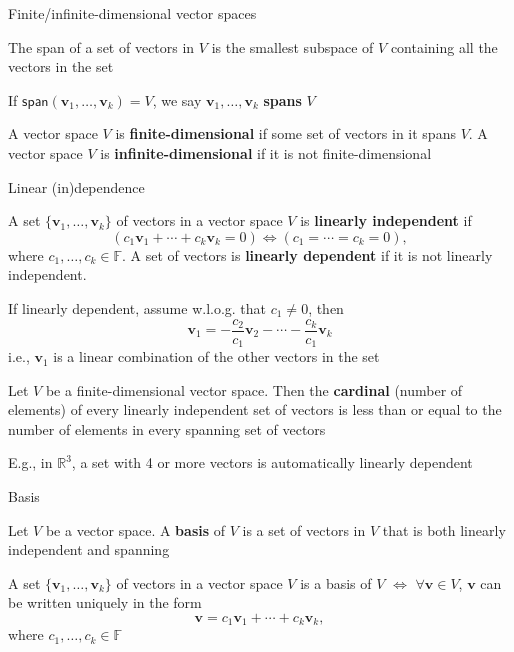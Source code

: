 \documentclass{beamer}
\def\IF{\mathbb{F}}
\def\IR{\mathbb{R}}
\def\bv{\mathbf{v}}
\renewcommand{\span}{\ensuremath{\mathsf{span}}}
\begin{document}
\begin{frame}{Finite/infinite-dimensional vector spaces}
	\begin{theorem}
		The span of a set of vectors in $V$ is the smallest subspace of $V$ containing all the vectors in the set
	\end{theorem}
	\vfill
	\begin{definition}
		If $\span(\bv_1,\ldots,\bv_k)=V$, we say $\bv_1,\ldots,\bv_k$ \textbf{spans} $V$
	\end{definition}
	\vfill
	\begin{definition}
		A vector space $V$ is \textbf{finite-dimensional} if some set of vectors in it spans $V$.
		A vector space $V$ is \textbf{infinite-dimensional} if it is not finite-dimensional
	\end{definition}
\end{frame}


\begin{frame}{Linear (in)dependence}
	\begin{definition}
		A set $\{\bv_1,\ldots,\bv_k\}$ of vectors in a vector space $V$ is \textbf{linearly independent} if
		\[
		\left(c_1\bv_1+\cdots+c_k\bv_k=0\right)
		\Leftrightarrow
		\left(c_1=\cdots=c_k=0\right),
		\]
		where $c_1,\ldots,c_k\in\IF$. 
		A set of vectors is \textbf{linearly dependent} if it is not linearly independent.
	\end{definition}
	\vfill
	If linearly dependent, assume w.l.o.g. that $c_1\neq 0$, then
	\[
	\bv_1 = -\frac{c_2}{c_1}\bv_2-\cdots-\frac{c_k}{c_1}\bv_k
	\]
	i.e., $\bv_1$ is a linear combination of the other vectors in the set
\end{frame}


\begin{frame}
	\begin{theorem}
		Let $V$ be a finite-dimensional vector space. Then the \textbf{cardinal} (number of elements) of every linearly independent set of vectors is less than or equal to the number of elements in every spanning set of vectors
	\end{theorem}
\vfill
E.g., in $\IR^3$, a set with 4 or more vectors is automatically linearly dependent
\end{frame}


\begin{frame}{Basis}
	\begin{definition}[Basis]
		Let $V$ be a vector space. A \textbf{basis} of $V$ is a set of vectors in $V$ that is both linearly independent and spanning
	\end{definition}
	\vfill
	\begin{theorem}
		A set $\{\bv_1,\ldots,\bv_k\}$ of vectors in a vector space $V$ is a basis of $V$ $\iff$ $\forall \bv\in V$, $\bv$ can be written uniquely in the form
		\[
		\bv=c_1\bv_1+\cdots+c_k\bv_k,
		\]
		where $c_1,\ldots,c_k\in\IF$
	\end{theorem}
\end{frame}
\end{document}

